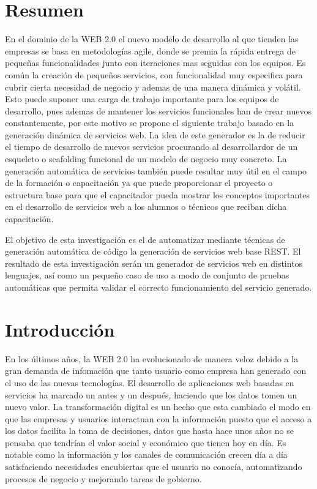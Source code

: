 \documentclass[a4paper,11pt]{book}
\begin{document}


\tableofcontents
\listoffigures

%

%


\chapter{Resumen}

En el dominio de la WEB 2.0 el nuevo modelo de desarrollo al que tienden las empresas se basa en metodologías agile, donde se premia la rápida entrega de pequeñas funcionalidades junto con iteraciones mas seguidas con los equipos. Es común la creación de pequeños servicios, con funcionalidad muy especifica para cubrir cierta necesidad de negocio y ademas de una manera dinámica y volátil. Esto puede suponer una carga de trabajo importante para los equipos de desarrollo, pues ademas de mantener los servicios funcionales han de crear nuevos constantemente, por este motivo se propone el siguiente trabajo basado en la generación dinámica de servicios web.  La idea de este generador es la de reducir el tiempo de desarrollo de nuevos servicios procurando al desarrollardor de un esqueleto o scafolding funcional de un modelo de negocio muy concreto. La generación automática de servicios también puede resultar muy útil en el campo de la formación o capacitación ya que puede proporcionar el proyecto o estructura base para que el capacitador pueda mostrar los conceptos importantes en el desarrollo de servicios web a los alumnos o técnicos que reciban dicha capacitación.  


El objetivo de esta investigación es el de automatizar mediante técnicas de generación automática de código la generación de servicios web base REST.  El resultado de esta investigación serán un generador de servicios web en distintos lenguajes, así como un pequeño caso de uso a modo de conjunto de pruebas automáticas que permita validar el correcto funcionamiento del servicio generado. 
 
\chapter{Introducción}

En los últimos años, la WEB 2.0 ha evolucionado de manera veloz debido a la gran demanda de infomación que tanto usuario como empresa han generado con el uso de las nuevas tecnologías. El desarrollo de aplicaciones web basadas en servicios ha marcado un antes y un después, haciendo que los datos tomen un nuevo valor. La transformación digital es un hecho que esta cambiado el modo en que las empresas y usuarios interactuan con la información puesto que el acceso a los datos facilita la toma de decisiones, datos que hasta hace unos años no se pensaba que tendrían el valor social y económico que tienen hoy en día. Es notable como la información y los canales de comunicación crecen día a día satisfaciendo necesidades encubiertas que el usuario no conocía, automatizando procesos de negocio y mejorando tareas de gobierno.  
\end{document}
